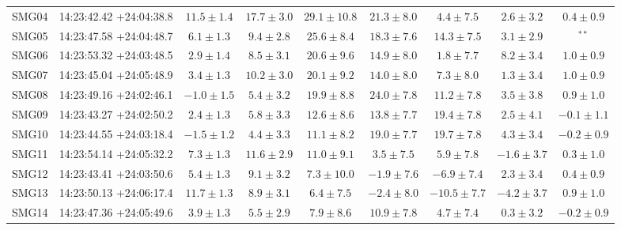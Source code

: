 \documentclass[twocolumn,traditabstract]{aa}
\begin{document}
\begin{table}[h]
\begin{center}
\begin{tabular}{ccccccccc}
SMG04 & 14:23:42.42 +24:04:38.8 & $    11.5 \pm      1.4$ & $    17.7 \pm      3.0$ & $    29.1 \pm     10.8$ & $    21.3 \pm      8.0$ & $     4.4 \pm      7.5$ & $     2.6 \pm      3.2$ & $     0.4 \pm      0.9$ \\
SMG05 & 14:23:47.58 +24:04:48.7 & $     6.1 \pm      1.3$ & $     9.4 \pm      2.8$ & $    25.6 \pm      8.4$ & $    18.3 \pm      7.6$ & $    14.3 \pm      7.5$ & $     3.1 \pm      2.9$ & $^{**}$ \\
SMG06 & 14:23:53.32 +24:03:48.5 & $     2.9 \pm      1.4$ & $     8.5 \pm      3.1$ & $    20.6 \pm      9.6$ & $    14.9 \pm      8.0$ & $     1.8 \pm      7.7$ & $     8.2 \pm      3.4$ & $     1.0 \pm      0.9$ \\
SMG07 & 14:23:45.04 +24:05:48.9 & $     3.4 \pm      1.3$ & $    10.2 \pm      3.0$ & $    20.1 \pm      9.2$ & $    14.0 \pm      8.0$ & $     7.3 \pm      8.0$ & $     1.3 \pm      3.4$ & $     1.0 \pm      0.9$ \\
SMG08 & 14:23:49.16 +24:02:46.1 & $    -1.0 \pm      1.5$ & $     5.4 \pm      3.2$ & $    19.9 \pm      8.8$ & $    24.0 \pm      7.8$ & $    11.2 \pm      7.8$ & $     3.5 \pm      3.8$ & $     0.9 \pm      1.0$ \\
SMG09 & 14:23:43.27 +24:02:50.2 & $     2.4 \pm      1.3$ & $     5.8 \pm      3.3$ & $    12.6 \pm      8.6$ & $    13.8 \pm      7.7$ & $    19.4 \pm      7.8$ & $     2.5 \pm      4.1$ & $    -0.1 \pm      1.1$ \\
SMG10 & 14:23:44.55 +24:03:18.4 & $    -1.5 \pm      1.2$ & $     4.4 \pm      3.3$ & $    11.1 \pm      8.2$ & $    19.0 \pm      7.7$ & $    19.7 \pm      7.8$ & $     4.3 \pm      3.4$ & $    -0.2 \pm      0.9$ \\
SMG11 & 14:23:54.14 +24:05:32.2 & $     7.3 \pm      1.3$ & $    11.6 \pm      2.9$ & $    11.0 \pm      9.1$ & $     3.5 \pm      7.5$ & $     5.9 \pm      7.8$ & $    -1.6 \pm      3.7$ & $     0.3 \pm      1.0$ \\
SMG12 & 14:23:43.41 +24:03:50.6 & $     5.4 \pm      1.3$ & $     9.1 \pm      3.2$ & $     7.3 \pm     10.0$ & $    -1.9 \pm      7.6$ & $    -6.9 \pm      7.4$ & $     2.3 \pm      3.4$ & $     0.4 \pm      0.9$ \\
SMG13 & 14:23:50.13 +24:06:17.4 & $    11.7 \pm      1.3$ & $     8.9 \pm      3.1$ & $     6.4 \pm      7.5$ & $    -2.4 \pm      8.0$ & $   -10.5 \pm      7.7$ & $    -4.2 \pm      3.7$ & $     0.9 \pm      1.0$ \\
SMG14 & 14:23:47.36 +24:05:49.6 & $     3.9 \pm      1.3$ & $     5.5 \pm      2.9$ & $     7.9 \pm      8.6$ & $    10.9 \pm      7.8$ & $     4.7 \pm      7.4$ & $     0.3 \pm      3.2$ & $    -0.2 \pm      0.9$ \\

\end{tabular}
\end{center}
\end{table}
\end{document}
